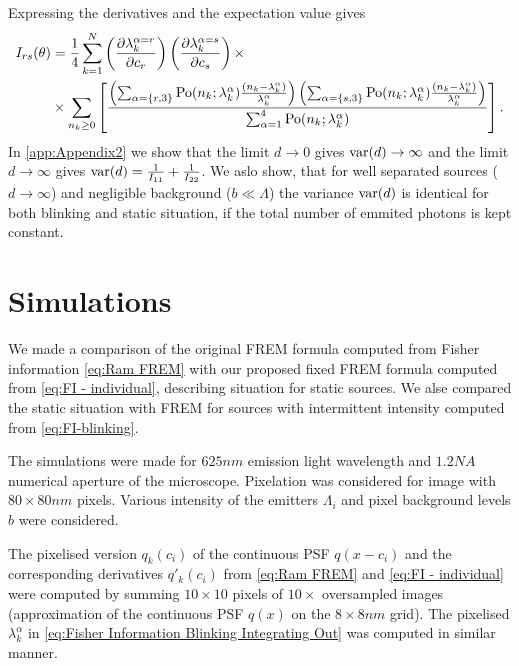 Expressing the derivatives and the expectation value gives
%
\begin{alignat}{2}
	I_{rs}(\theta)
	&=\frac{1}{4}\sum_{k=1}^N\left(\frac{\partial\lambda_k^{\alpha=r}}{\partial c_r}\right)\left(\frac{\partial\lambda_k^{\alpha=s}}{\partial c_s}\right)\times \nonumber\\
	&\times \sum_{n_k\geq0}\left[\frac{\left(\sum_{\alpha=\{r,3\}}\mathrm{Po}(n_k;\lambda_k^\alpha)\frac{(n_k-\lambda_k^\alpha)}{\lambda_k^\alpha}\right)\left(\sum_{\alpha=\{s,3\}}\mathrm{Po}(n_k;\lambda_k^\alpha)\frac{(n_k-\lambda_k^\alpha)}{\lambda_k^\alpha}\right)}{\sum_{\alpha=1}^4\mathrm{Po}(n_k;\lambda_k^\alpha)}\right].
	\label{eq:FI-blinking}
\end{alignat}
%
In \autoref{app:Appendix2} we show that the limit $d\rightarrow0$ gives $\mathrm{var}(d)\rightarrow\infty$ and the limit $d\rightarrow\infty$ gives $\mathrm{var}(d)=\frac{1}{I_{11}}+\frac{1}{I_{22}}$. We aslo show, that for well separated sources ($d\rightarrow\infty$) and negligible background ($b\ll\Lambda$) the variance $\mathrm{var}(d)$ is identical for both blinking and static situation, if the total number of emmited photons is kept constant. 


\section{Simulations\label{sec:FREM simulations}} 
We made a comparison of the original FREM formula computed from Fisher information \autoref{eq:Ram FREM} with our proposed fixed FREM formula computed from \autoref{eq:FI - individual}, describing situation for static sources. We alse compared the static situation with FREM for sources with intermittent intensity computed from \autoref{eq:FI-blinking}.

The simulations were made for $625\unit{nm}$ emission light wavelength and $1.2\unit{NA}$ numerical aperture of the microscope. Pixelation was considered for image with $80\times80\unit{nm}$ pixels. Various intensity of the emitters $\Lambda_i$ and pixel background levels $b$ were considered.

The pixelised version $q_k(c_i)$ of the continuous PSF $q(x-c_i)$ and the corresponding derivatives $q'_k(c_i)$ from \autoref{eq:Ram FREM} and \autoref{eq:FI - individual} were computed by summing $10\times10$ pixels of $10\times$ oversampled images (approximation of the continuous PSF $q(x)$ on the $8\times8 \unit{nm}$ grid). The pixelised $\lambda^\alpha_k$ in \autoref{eq:Fisher Information Blinking Integrating Out} was computed in similar manner. 

